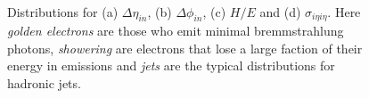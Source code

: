 \begin{figure}[htp]%
\centering
{}\qquad
{}\\
\qquad
{}
\caption[Distributions for the variables $\Delta\eta_{\text in}$, $\Delta\phi_{\text in}$, $\sigma_{i\eta i\eta}$ and $H/E$ for simulated electrons and misidentified jets.]{Distributions for (a) $\Delta\eta_{in}$, (b) $\Delta\phi_{in}$, (c) $H/E$ and (d) $\sigma_{i \eta i \eta}$. Here \textit{golden electrons} are those who emit minimal bremmstrahlung photons, \textit{showering} are electrons that lose a large faction of their energy in emissions and \textit{jets} are the typical distributions for hadronic jets.}
\label{FIGURE:EventReconstructionPhysicsObjects_Electrons}
\end{figure}



